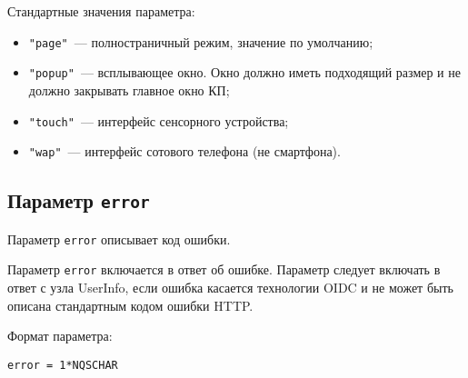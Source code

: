 Стандартные значения параметра:
%
\begin{itemize}
\item
\lstinline{"page"}~--- полностраничный режим, значение по умолчанию;

\item
\lstinline{"popup"}~--- 
всплывающее окно. Окно должно иметь подходящий размер и не должно 
закрывать главное окно КП;

\item
\lstinline{"touch"}~---
интерфейс сенсорного устройства;

\item
\lstinline{"wap"}~---
интерфейс сотового телефона (не смартфона).
\end{itemize}

\subsection{Параметр \lstinline{error}}\label{PARAMS.Error}

Параметр \lstinline{error} описывает код ошибки.

Параметр \lstinline{error} включается в ответ об ошибке.
%
Параметр следует включать в ответ с узла UserInfo, если ошибка касается 
технологии OIDC и не может быть описана стандартным кодом ошибки HTTP.

Формат параметра:
\begin{lstlisting}
error = 1*NQSCHAR
\end{lstlisting}

